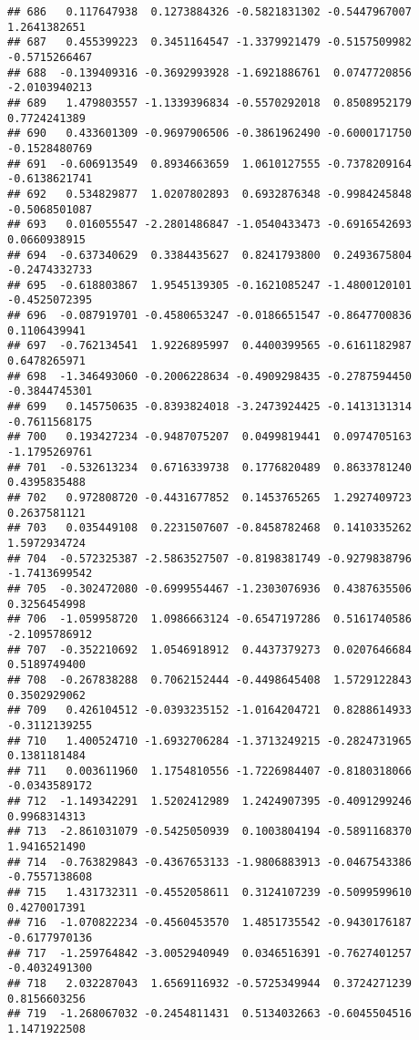 \documentclass[
]{article}
\begin{document}
\begin{verbatim}
## 686   0.117647938  0.1273884326 -0.5821831302 -0.5447967007  1.2641382651
## 687   0.455399223  0.3451164547 -1.3379921479 -0.5157509982 -0.5715266467
## 688  -0.139409316 -0.3692993928 -1.6921886761  0.0747720856 -2.0103940213
## 689   1.479803557 -1.1339396834 -0.5570292018  0.8508952179  0.7724241389
## 690   0.433601309 -0.9697906506 -0.3861962490 -0.6000171750 -0.1528480769
## 691  -0.606913549  0.8934663659  1.0610127555 -0.7378209164 -0.6138621741
## 692   0.534829877  1.0207802893  0.6932876348 -0.9984245848 -0.5068501087
## 693   0.016055547 -2.2801486847 -1.0540433473 -0.6916542693  0.0660938915
## 694  -0.637340629  0.3384435627  0.8241793800  0.2493675804 -0.2474332733
## 695  -0.618803867  1.9545139305 -0.1621085247 -1.4800120101 -0.4525072395
## 696  -0.087919701 -0.4580653247 -0.0186651547 -0.8647700836  0.1106439941
## 697  -0.762134541  1.9226895997  0.4400399565 -0.6161182987  0.6478265971
## 698  -1.346493060 -0.2006228634 -0.4909298435 -0.2787594450 -0.3844745301
## 699   0.145750635 -0.8393824018 -3.2473924425 -0.1413131314 -0.7611568175
## 700   0.193427234 -0.9487075207  0.0499819441  0.0974705163 -1.1795269761
## 701  -0.532613234  0.6716339738  0.1776820489  0.8633781240  0.4395835488
## 702   0.972808720 -0.4431677852  0.1453765265  1.2927409723  0.2637581121
## 703   0.035449108  0.2231507607 -0.8458782468  0.1410335262  1.5972934724
## 704  -0.572325387 -2.5863527507 -0.8198381749 -0.9279838796 -1.7413699542
## 705  -0.302472080 -0.6999554467 -1.2303076936  0.4387635506  0.3256454998
## 706  -1.059958720  1.0986663124 -0.6547197286  0.5161740586 -2.1095786912
## 707  -0.352210692  1.0546918912  0.4437379273  0.0207646684  0.5189749400
## 708  -0.267838288  0.7062152444 -0.4498645408  1.5729122843  0.3502929062
## 709   0.426104512 -0.0393235152 -1.0164204721  0.8288614933 -0.3112139255
## 710   1.400524710 -1.6932706284 -1.3713249215 -0.2824731965  0.1381181484
## 711   0.003611960  1.1754810556 -1.7226984407 -0.8180318066 -0.0343589172
## 712  -1.149342291  1.5202412989  1.2424907395 -0.4091299246  0.9968314313
## 713  -2.861031079 -0.5425050939  0.1003804194 -0.5891168370  1.9416521490
## 714  -0.763829843 -0.4367653133 -1.9806883913 -0.0467543386 -0.7557138608
## 715   1.431732311 -0.4552058611  0.3124107239 -0.5099599610  0.4270017391
## 716  -1.070822234 -0.4560453570  1.4851735542 -0.9430176187 -0.6177970136
## 717  -1.259764842 -3.0052940949  0.0346516391 -0.7627401257 -0.4032491300
## 718   2.032287043  1.6569116932 -0.5725349944  0.3724271239  0.8156603256
## 719  -1.268067032 -0.2454811431  0.5134032663 -0.6045504516  1.1471922508

\end{verbatim}
\end{document}

